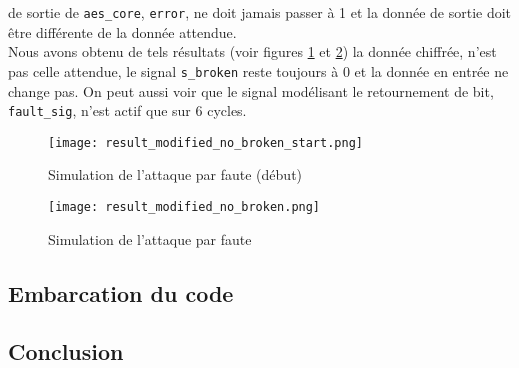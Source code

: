 de sortie de \texttt{aes\_core}, \texttt{error}, ne doit jamais passer à 1 et
la donnée de sortie doit être différente de la donnée attendue. \\
Nous avons obtenu de tels résultats (voir figures \ref{modified_start} et
\ref{modified}) la donnée chiffrée, n'est pas celle attendue, le signal
\texttt{s_broken} reste toujours à 0 et la donnée en entrée ne change pas. On peut
aussi voir que le signal modélisant le retournement de bit, \texttt{fault_sig},
n'est actif que sur 6 cycles.
\begin{figure}[htbp]
	\begin{center}
		\texttt{[image: result\_modified\_no\_broken\_start.png]}
		\caption{Simulation de l'attaque par faute (début)}
		\label{modified_start}
	\end{center}
\end{figure}
\begin{figure}[htbp]
	\begin{center}
		\texttt{[image: result\_modified\_no\_broken.png]}
		\caption{Simulation de l'attaque par faute}
		\label{modified}
	\end{center}
\end{figure}

\subsection{Embarcation du code}


\subsection{Conclusion}
